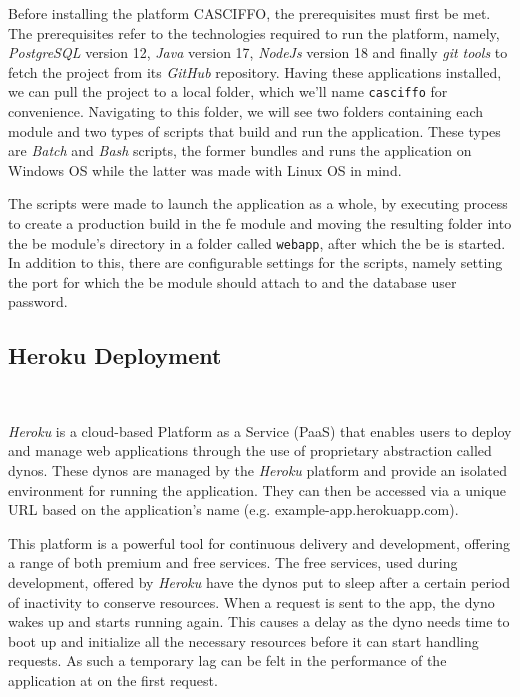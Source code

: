 Before installing the platform CASCIFFO, the prerequisites must first be met. The prerequisites refer to the technologies required to run the platform, namely, \textit{PostgreSQL} version 12, \textit{Java} version 17, \textit{NodeJs} version 18 and finally \textit{git tools} to fetch the project from its \textit{GitHub} repository.
Having these applications installed, we can pull the project to a local folder, which we'll name \lstinline{casciffo} for convenience. Navigating to this folder, we will see two folders containing each module and two types of scripts that build and run the application. These types are \textit{Batch} and \textit{Bash} scripts, the former bundles and runs the application on Windows OS while the latter was made with Linux OS in mind. 

The scripts were made to launch the application as a whole, by executing process to create a production build in the \acrshort{fe} module and moving the resulting folder into the \acrshort{be} module's directory in a folder called \lstinline{webapp}, after which the \acrshort{be} is started. 
In addition to this, there are configurable settings for the scripts, namely setting the port for which the \acrshort{be} module should attach to and the database user password.


\subsection{Heroku Deployment}~\label{ch:impl:sec:install-deploy:ss:heroku}

\textit{Heroku} is a cloud-based Platform as a Service (PaaS) that enables users to deploy and manage web applications through the use of proprietary abstraction called dynos. These dynos are managed by the \textit{Heroku} platform and provide an isolated environment for running the application. They can then be accessed via a unique URL based on the application's name (e.g. example-app.herokuapp.com).

This platform is a powerful tool for continuous delivery and development, offering a range of both premium and free services. The free services, used during development, offered by \textit{Heroku} have the dynos put to sleep after a certain period of inactivity to conserve resources. When a request is sent to the app, the dyno wakes up and starts running again. This causes a delay as the dyno needs time to boot up and initialize all the necessary resources before it can start handling requests. As such a temporary lag can be felt in the performance of the application at on the first request. 

